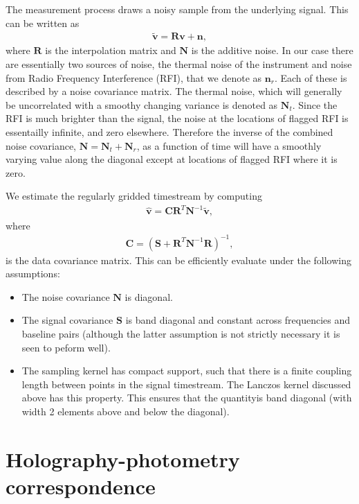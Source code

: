 The measurement process draws a noisy sample from the underlying signal. This
can be written as 
\begin{align}
\tilde{\mathbf{v}} = \mathbf{R}\mathbf{v} + \mathbf{n},
\end{align}
where $\mathbf{R}$ is the interpolation matrix and $\mathbf{N}$ is the additive noise. In our case there are essentially two sources of noise, the thermal noise of the instrument and noise from
Radio Frequency Interference (RFI), that we denote as $\mathbf{n}_r$. Each of these is described
by a noise covariance matrix. The thermal noise, which will generally be uncorrelated with a smoothy changing variance is denoted as $\mathbf{N}_t$. Since the RFI is much brighter than the signal, the noise at the locations of flagged RFI is essentailly infinite, and zero elsewhere. Therefore the inverse of the combined noise covariance, $\mathbf{N} = \mathbf{N}_t + \mathbf{N}_r$, as a function of time will have a smoothly varying value along the diagonal except at locations of flagged RFI where it is zero.

We estimate the regularly gridded timestream by computing
\begin{align}
\hat{\mathbf{v}} = \mathbf{CR}^T \mathbf{N}^{-1} \tilde{\mathbf{v}},
\end{align}
where
\begin{align}
\mathbf{C} = (\mathbf{S} + \mathbf{R}^T \mathbf{N}^{-1} \mathbf{R})^{-1},
\end{align}
is the data covariance matrix. This can be efficiently evaluate under the following assumptions:
\begin{itemize}
\item The noise covariance $\mathbf{N}$ is diagonal.
\item The signal covariance $\mathbf{S}$ is band diagonal and constant across frequencies and baseline pairs (although the latter assumption is not strictly necessary it is seen to peform well).
\item The sampling kernel has compact support, such that there is a finite coupling
length between points in the signal timestream. The Lanczos kernel discussed
above has this property. This ensures that the quantityis band diagonal (with width 2 elements above and below the diagonal).
\end{itemize}

\section{Holography-photometry correspondence}
\label{app:hol:sec:photometry}

